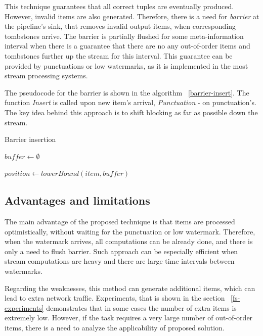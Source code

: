 This technique guarantees that all correct tuples are eventually produced. However, invalid items are also generated. Therefore, there is a need for {\it barrier} at the pipeline's sink, that removes invalid output items, when corresponding tombstones arrive. The barrier is partially flushed for some meta-information interval when there is a guarantee that there are no any out-of-order items and tombstones further up the stream for this interval. This guarantee can be provided by punctuations or low watermarks, as it is implemented in the most stream processing systems. 

The pseudocode for the barrier is shown in the algorithm  ~\ref{barrier-insert}. The function {\it Insert} is called upon new item's arrival, {\it Punctuation} - on punctuation's. The key idea behind this approach is to shift blocking as far as possible down the stream.

\begin{algorithm}
\caption{Barrier insertion}
\label{barrier-insert}
  \begin{algorithmic}[1]
    \State $buffer \gets \emptyset$

    \State

      \State $position \gets lowerBound(item, buffer)$
        \State {}
      \Else
        \State {}
      \EndIf
    \EndFunction

    \State

        \State {}
        \State {}
      \EndFor
    \EndFunction
  \end{algorithmic}
\end{algorithm}

\subsection{Advantages and limitations}
The main advantage of the proposed technique is that items are processed optimistically, without waiting for the punctuation or low watermark. Therefore, when the watermark arrives, all computations can be already done, and there is only a need to flush barrier. Such approach can be especially efficient when stream computations are heavy and there are large time intervals between watermarks.

Regarding the weaknesses, this method can generate additional items, which can lead to extra network traffic. Experiments, that is shown in the section ~\ref{fs-experiments} demonstrates that in some cases the number of extra items is extremely low. However, if the task requires a very large number of out-of-order items, there is a need to analyze the applicability of proposed solution.


